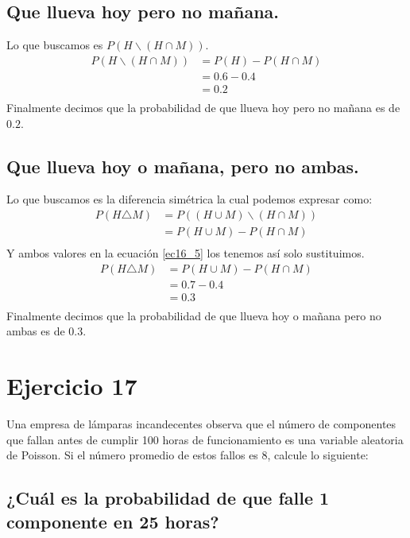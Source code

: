 \documentclass[12pt]{article}
\begin{document}
\subsection{Que llueva hoy pero no mañana.}
Lo que buscamos es $P(H\backslash (H\cap M))$.
\begin{equation}\label{ec16_3}
\begin{split}
P(H\backslash (H\cap M)) &= P(H) - P(H\cap M)\\
&= 0.6 - 0.4\\
&= 0.2\\
\end{split}
\end{equation}
Finalmente decimos que la probabilidad de que llueva hoy pero no mañana es de $0.2$.
\subsection{Que llueva hoy o mañana, pero no ambas.}
Lo que buscamos es la diferencia simétrica la cual podemos expresar como:
\begin{equation}\label{ec16_5}
\begin{split}
P(H\triangle M) &= P((H\cup M) \backslash (H\cap M))\\
&= P(H\cup M) - P(H\cap M)\\
\end{split}
\end{equation}
Y ambos valores en la ecuación \ref{ec16_5} los tenemos así solo sustituimos.
\begin{equation}\label{ec16_6}
\begin{split}
P(H\triangle M) &= P(H\cup M) - P(H\cap M)\\
&= 0.7 - 0.4\\
&= 0.3\\
\end{split}
\end{equation}
Finalmente decimos que la probabilidad de que llueva hoy o mañana pero no ambas es de $0.3$. 
\section{Ejercicio 17}
Una empresa de lámparas incandecentes observa que el número de componentes que fallan
antes de cumplir 100 horas de funcionamiento es una variable aleatoria de Poisson. Si el
número promedio de estos fallos es 8, calcule lo siguiente:
\subsection{¿Cuál es la probabilidad de que falle 1 componente en 25 horas?}
\end{document}
